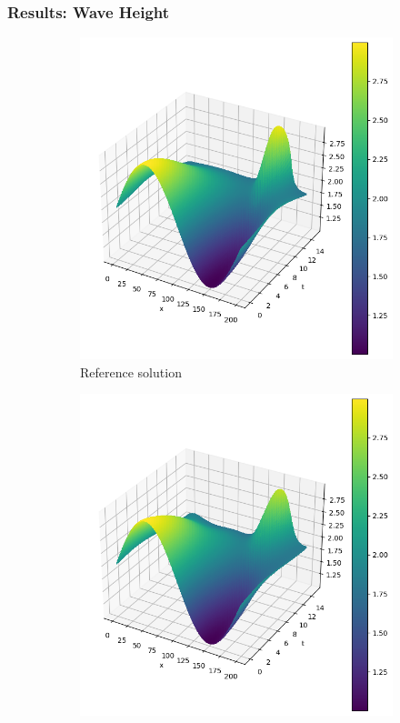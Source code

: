 \begin{frame}
    \frametitle{Results: Wave Height}

    \begin{figure}
        \centering
        \begin{subfigure}[b]{0.45\textwidth}
            \centering
            \includegraphics[width=\textwidth]{images/homogeneous_swe_pseudospectral_height.png}
            \caption{Reference solution}
            \label{fig:10_homogeneous_pseudospectral_swe_height}
        \end{subfigure}
        \hfill
        \begin{subfigure}[b]{0.45\textwidth}
            \centering
            \includegraphics[width=\textwidth]{images/homogeneous_swe_pinn_height.png}

\end{subfigure}
\end{figure}
\end{frame}
